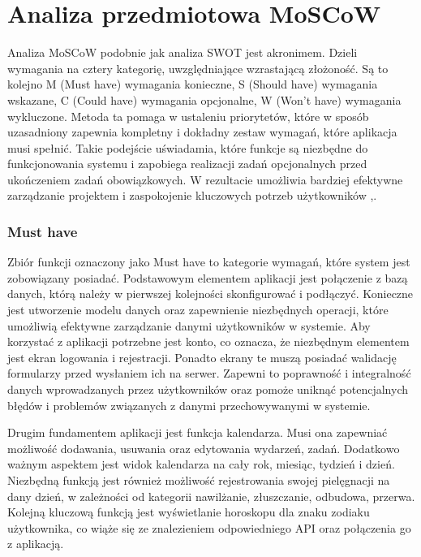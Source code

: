 \section{Analiza przedmiotowa MoSCoW}
\phantom{Th}
Analiza MoSCoW podobnie jak analiza SWOT jest akronimem. Dzieli wymagania na cztery kategorię, uwzględniające wzrastającą złożoność.
Są to kolejno M (Must have) wymagania konieczne, S (Should have) wymagania wskazane, C (Could have) wymagania opcjonalne,
W (Won't have) wymagania wykluczone. Metoda ta pomaga w ustaleniu priorytetów, które w sposób uzasadniony zapewnia kompletny
i dokładny zestaw wymagań, które aplikacja musi spełnić. Takie podejście uświadamia, które funkcje są niezbędne do funkcjonowania systemu
i zapobiega realizacji zadań opcjonalnych przed ukończeniem zadań obowiązkowych. W rezultacie umożliwia bardziej efektywne zarządzanie projektem i zaspokojenie kluczowych potrzeb użytkowników \cite{moscow},\cite{businessanalysis}.

\subsubsection*{\textbf{Must have}}
\phantom{Th}
Zbiór funkcji oznaczony jako Must have to kategorie wymagań, które system jest zobowiązany posiadać.
Podstawowym elementem aplikacji jest połączenie z bazą danych, którą należy w pierwszej kolejności skonfigurować
i podłączyć. Konieczne jest utworzenie modelu danych oraz zapewnienie niezbędnych operacji,
które umożliwią efektywne zarządzanie danymi użytkowników w systemie. Aby korzystać z aplikacji potrzebne jest konto,
co oznacza, że niezbędnym elementem jest ekran logowania i rejestracji.
Ponadto ekrany te muszą posiadać walidację formularzy przed wysłaniem ich na serwer. Zapewni to poprawność
i integralność danych wprowadzanych przez użytkowników oraz pomoże uniknąć potencjalnych błędów
i problemów związanych z danymi przechowywanymi w systemie.

Drugim fundamentem aplikacji jest funkcja kalendarza. Musi ona zapewniać możliwość dodawania, usuwania oraz edytowania wydarzeń, zadań.
Dodatkowo ważnym aspektem jest widok kalendarza na cały rok, miesiąc, tydzień i dzień.
Niezbędną funkcją jest również możliwość rejestrowania swojej pielęgnacji na dany dzień, w zależności od kategorii nawilżanie,
złuszczanie, odbudowa, przerwa. Kolejną kluczową funkcją jest wyświetlanie horoskopu dla znaku zodiaku użytkownika,
co wiąże się ze znalezieniem odpowiedniego API oraz połączenia go z aplikacją.

